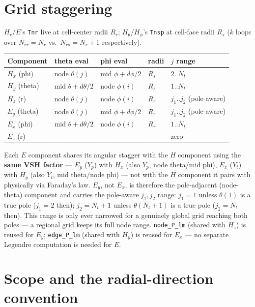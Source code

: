 \documentclass[11pt]{article}
\begin{document}
\section{Grid staggering}

$H_r$/$E$'s \texttt{Tnr} live at cell-center radii $R_r$; $H_\theta$/$H_\phi$'s \texttt{Tnsp} at
cell-face radii $R_s$ ($k$ loops over $N_{rr}=N_r$ vs.\ $N_{rs}=N_r{+}1$ respectively).

\begin{table}[h]
\centering
\begin{tabular}{lllll}
\toprule
Component & theta eval & phi eval & radii & $j$ range \\
\midrule
$H_x$ (phi)    & node $\theta(j)$      & mid $\phi{+}d\phi/2$ & $R_s$ & $2..N_t$ \\
$H_y$ (theta)  & mid $\theta{+}d\theta/2$ & node $\phi(i)$    & $R_s$ & $1..N_t$ \\
$H_z$ (r)      & node $\theta(j)$      & node $\phi(i)$       & $R_r$ & $j_1..j_2$ (pole-aware) \\
$E_y$ (theta)  & node $\theta(j)$      & mid $\phi{+}d\phi/2$ & $R_r$ & $j_1..j_2$ (pole-aware) \\
$E_x$ (phi)    & mid $\theta{+}d\theta/2$ & node $\phi(i)$    & $R_r$ & $1..N_t$ \\
$E_z$ (r)      & --- & --- & --- & zero \\
\bottomrule
\end{tabular}
\end{table}

Each $E$ component shares its angular stagger with the $H$ component using the \textbf{same VSH
factor} --- $E_y$ ($Y_p$) with $H_x$ (also $Y_p$, node theta/mid phi), $E_x$ ($Y_t$) with $H_y$
(also $Y_t$, mid theta/node phi) --- not with the $H$ component it pairs with physically via
Faraday's law. $E_y$, not $E_x$, is therefore the pole-adjacent (node-theta) component and
carries the pole-aware $j_1,j_2$ range: $j_1=1$ unless $\theta(1)$ is a true pole ($j_1=2$ then);
$j_2=N_t{+}1$ unless $\theta(N_t{+}1)$ is a true pole ($j_2=N_t$ then). This range is only ever
narrowed for a genuinely global grid reaching both poles --- a regional grid keeps its full node
range. \texttt{node\_P\_lm} (shared with $H_z$) is reused for $E_y$; \texttt{edge\_P\_lm}
(shared with $H_y$) is reused for $E_x$ --- no separate Legendre computation is needed for $E$.

\section{Scope and the radial-direction convention}
\end{document}
